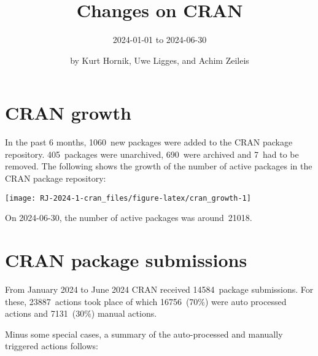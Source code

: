\title{Changes on CRAN}

\subtitle{%
2024-01-01 to 2024-06-30
}

\author{by Kurt Hornik, Uwe Ligges, and Achim Zeileis}

\maketitle


\section{CRAN growth}\label{cran-growth}

In the past 6 months, 1060~new packages were
added to the CRAN package repository. 405~packages
were unarchived, 690~were archived and
7~had to be removed. The following shows the
growth of the number of active packages in the CRAN package repository:

\begin{center}\texttt{[image: RJ-2024-1-cran\_files/figure-latex/cran\_growth-1]} \end{center}

\noindent On 2024-06-30, the number of active packages was around~21018.

\section{CRAN package submissions}\label{cran-package-submissions}

From January 2024 to June 2024
CRAN received 14584~package submissions.
For these, 23887~actions took place of which
16756~(70\%) were auto processed actions and
7131~(30\%) manual actions.

Minus some special cases, a summary of the auto-processed and manually
triggered actions follows:

